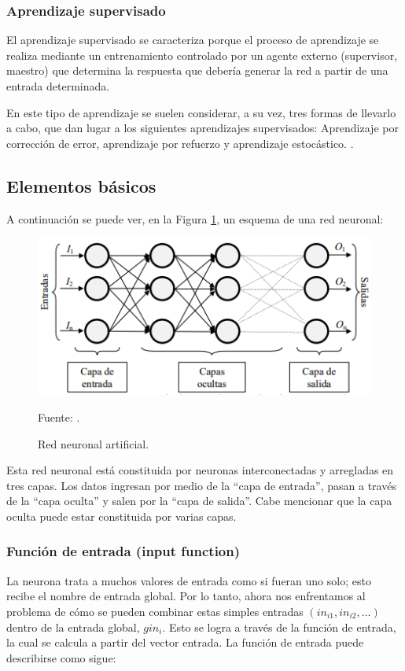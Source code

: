 \subsubsection{Aprendizaje supervisado}
El aprendizaje supervisado se caracteriza porque el proceso de aprendizaje se realiza mediante un entrenamiento controlado por un agente externo (supervisor, maestro) que determina la respuesta que debería generar la red a partir de una entrada determinada.

En este tipo de aprendizaje se suelen considerar, a su vez, tres formas de llevarlo a cabo, que dan lugar a los siguientes aprendizajes supervisados: Aprendizaje por corrección de error, aprendizaje por refuerzo y aprendizaje estocástico. \citep{matich2001redes}.

\subsection{Elementos básicos}
A continuación se puede ver, en la Figura \ref{fig:rnaBasico}, un esquema de una red neuronal: 

\begin{figure}[h!]
	\centering
		\includegraphics[scale=0.8]{imagenes/rnaBasico.png}
		\caption{Red neuronal artificial.}
		\begin{center}
    Fuente: \cite{redneuronalimagen}.
    \end{center}
	\label{fig:rnaBasico}
\end{figure}

Esta red neuronal está constituida por neuronas interconectadas y arregladas en tres capas. Los datos ingresan por medio de la “capa de entrada”, pasan a través de la “capa oculta” y salen por la “capa de salida”. Cabe mencionar que la capa oculta puede estar constituida por varias capas.

\subsubsection{Función de entrada (input function)}
La neurona trata a muchos valores de entrada como si fueran uno solo; esto recibe el nombre de entrada global. Por lo tanto, ahora nos enfrentamos al problema de cómo se pueden combinar estas simples entradas $(in_{i1}, in_{i2}, ...)$ dentro de la entrada global, $gin_{i}$. Esto se logra a través de la función de entrada, la cual se calcula a partir del vector entrada. La función de entrada puede describirse como sigue:

